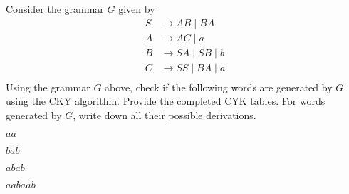  Consider the grammar $G$ given by
  \begin{align*}
    S &\rightarrow AB \mid BA \\
    A &\rightarrow AC \mid a \\
    B &\rightarrow SA \mid SB \mid b \\
    C &\rightarrow SS \mid BA \mid a \\
  \end{align*}
  Using the grammar $G$ above, check if the following words are generated
  by $G$ using the CKY algorithm. Provide the completed CYK tables.
  For words generated by $G$, write down all their
  possible derivations. 
  \begin{tightlist}
  \item $aa$
  \item $bab$
  \item $abab$
  \item $aabaab$
  \end{tightlist}
